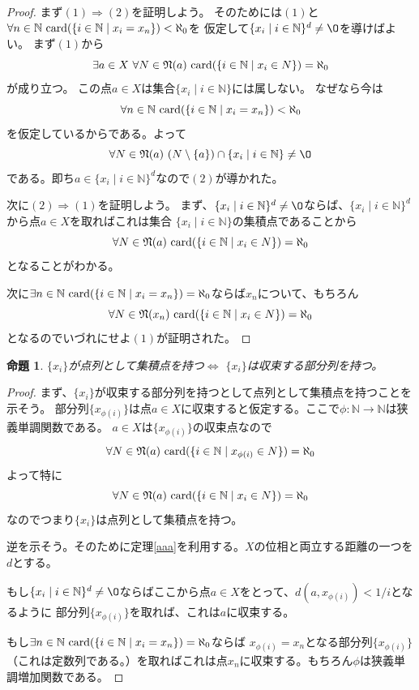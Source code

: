 \documentclass[leqno]{jsarticle}
\newtheorem{prop}[thm]{命題}
\newcommand{\To}{\Longrightarrow}
\newcommand{\nn}{\mathbb{N}}
\newcommand{\card}{\text{{\rm card}}}
\begin{document}
\begin{proof}
まず$(1)\To (2)$を証明しよう。
そのためには$(1)$と$\forall n\in \nn\ \card(\{i\in \nn\mid x_i=x_n\})<\aleph_0$を
仮定して$\{x_i\mid i\in \nn\}^d\neq \O$を導けばよい。
まず$(1)$から
\[
\exists a\in X\ \forall N\in \mathfrak{N}(a)\ \card(\{i\in \nn\mid x_i\in N\})=\aleph_0
\]
が成り立つ。
この点$a\in X$は集合$\{x_i\mid i\in \nn\}$には属しない。
なぜなら今は
\[
\forall n\in \nn\ \card(\{i\in \nn\mid x_i=x_n\})<\aleph_0
\]
を仮定しているからである。よって
\[
\forall N\in \mathfrak{N}(a)\ (N\setminus \{a\})\cap \{x_i\mid i\in \nn\}\neq \O
\]
である。即ち$a\in \{x_i\mid i\in \nn\}^d$なので$(2)$が導かれた。
\par
次に$(2)\To (1)$を証明しよう。
まず、$\{x_i\mid i\in \nn\}^d\neq \O$ならば、$\{x_i\mid i\in \nn\}^d$から点$a\in X$を取ればこれは集合
$\{x_i\mid i\in \nn\}$の集積点であることから
\[
\forall N\in \mathfrak{N}(a)\ \card(\{i\in \nn\mid x_i\in N\})=\aleph_0
\]
となることがわかる。
\par
次に$\exists n\in \nn\ \card(\{i\in \nn\mid x_i=x_n\})=\aleph_0$ならば$x_n$について、もちろん
\[
\forall N\in \mathfrak{N}(x_n)\ \card(\{i\in \nn\mid x_i\in N\})=\aleph_0
\]
となるのでいづれにせよ$(1)$が証明された。
\end{proof}
\begin{prop}
$\{x_i\}$が点列として集積点を持つ$\iff$ $\{x_i\}$は収束する部分列を持つ。
\end{prop}
\begin{proof}
まず、$\{x_i\}$が収束する部分列を持つとして点列として集積点を持つことを示そう。
部分列$\{x_{\phi(i)}\}$は点$a\in X$に収束すると仮定する。ここで$\phi:\nn\to \nn$は狭義単調関数である。
$a\in X$は$\{x_{\phi(i)}\}$の収束点なので
\[
\forall N\in \mathfrak{N}(a)\ \card(\{i\in \nn\mid x_{\phi(i)}\in N\})=\aleph_0
\]
よって特に
\[
\forall N\in \mathfrak{N}(a)\ \card(\{i\in \nn\mid x_{i}\in N\})=\aleph_0
\]
なのでつまり$\{x_i\}$は点列として集積点を持つ。
\par
逆を示そう。そのために定理\ref{aaa}を利用する。$X$の位相と両立する距離の一つを$d$とする。
\par
もし$\{x_i\mid i\in \nn\}^d\neq \O$ならばここから点$a\in X$をとって、$d(a,x_{\phi(i)})<1/i$となるように
部分列$\{x_{\phi(i)}\}$を取れば、これは$a$に収束する。
\par
もし$\exists n\in \nn\ \card(\{i\in \nn\mid x_i=x_n\})=\aleph_0$ならば
$x_{\phi(i)}=x_n$となる部分列$\{x_{\phi(i)}\}$（これは定数列である。）を取ればこれは点$x_n$に収束する。もちろん$\phi$は狭義単調増加関数である。
\end{proof}
\end{document}
